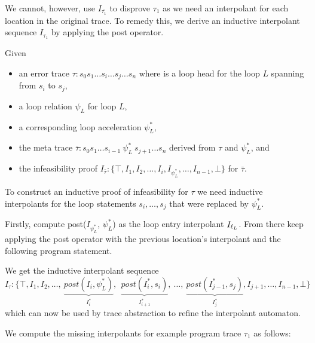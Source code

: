
We cannot, however, use $I_{\bar{\tau_1}}$ to disprove $\tau_1$ as we need an interpolant for each location in the original trace.
To remedy this, we derive an inductive interpolant sequence $I_{\tau_1}$ by applying the post operator.

\newcommand{\accels}[1]{\ensuremath{\psi^{*}_{#1}}}
Given
\begin{itemize}[topsep=0pt,itemsep=-1ex,partopsep=1ex,parsep=1ex]
	\item an error trace $\tau: s_0 s_1 \ldots s_i \ldots s_j \ldots s_n$ where  is a loop head for the loop $L$ spanning from $s_i$ to $s_j$,
	\item a loop relation $\psi_L$ for loop $L$,
	\item a corresponding loop acceleration \accels{L},
	\item the meta trace $\bar{\tau}: s_0 s_1 \ldots s_{i-1} \ \accels{L} \ s_{j+1} \ldots s_n$ derived from $\tau$ and \accels{L}, and
	\item the infeasibility proof $I_{\bar{\tau}}: \{\top, I_1, I_2, \ldots , I_i, I_{\psi^*_{L}}, \ldots , I_{n-1}, \bot \}$ for $\bar{\tau}$.
\end{itemize}

To construct an inductive proof of infeasibility for $\tau$ we need inductive interpolants for the loop statements $s_i, \ldots , s_j$ that were replaced by $\psi^*_{L}$.

Firstly, compute post($I_{\psi^*_L}$, $\psi^*_L$) as the loop entry interpolant $I_{\ell_{L}}$.
From there keep applying the post operator with the previous location's interpolant and the following program statement.

We get the inductive interpolant sequence
\begin{equation*}
	I_\tau: \{\top,I_1,I_2, \ldots ,\ \underbrace{post(I_i, \accels{L})}_{I_{i}^*},\ \ \underbrace{post(I_{i}^*, s_i)}_{I_{i+1}^*},\ \ldots ,\ \underbrace{post(I_{j-1}^*, s_j)}_{I_{j}^*},I_{j+1}, \ldots ,I_{n-1}, \bot \}
\end{equation*}
which can now be used by trace abstraction to refine the interpolant automaton.

We compute the missing interpolants for example program trace $\tau_1$ as follows:
\begin{comment}
\begin{figure}[H]
\centering

\captionof{figure}{Program trace $\tau_1$ of $P_1$ with inductive infeasibility proof.}
\end{figure}
\end{comment}

\begin{figure}[H]
	\begin{center}
		
	\end{center}
\end{figure}
\label{fig:ex:t0:infproof}


